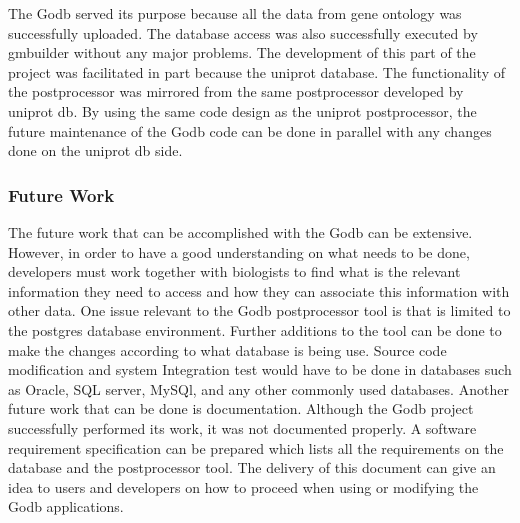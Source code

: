 \documentclass[12pt]{article}
\begin{document}
The Godb served its purpose because all the data from gene ontology was successfully uploaded.  The database access was also
successfully executed by gmbuilder without any major problems.  The development of this part of the project was facilitated
in part because the uniprot database.  The functionality of the postprocessor was mirrored from the same postprocessor
developed by uniprot db.  By using the same code design as the uniprot postprocessor, the future maintenance of the Godb
code can be done in parallel with any changes done on the uniprot db side.

\subsubsection{Future Work}
The future work that can be accomplished with the Godb can be extensive.  However, in order to have a good understanding on
what needs to be done, developers must work together with biologists to find what is the relevant information they need to
access and how they can associate this information with other data. One issue relevant to the Godb postprocessor tool is
that is limited to the postgres database environment.  Further additions to the tool can be done to make the changes
according to what database is being use.  Source code modification and system Integration test would have to be done in
databases such as Oracle, SQL server, MySQl, and any other commonly used databases.  Another future work that can be done is
documentation.  Although the Godb project successfully performed its work, it was not documented properly.  A software
requirement specification can be prepared which lists all the requirements on the database and the postprocessor tool.  The
delivery of this document can give an idea to users and developers on how to proceed when using or modifying the Godb
applications.
\end{document}
